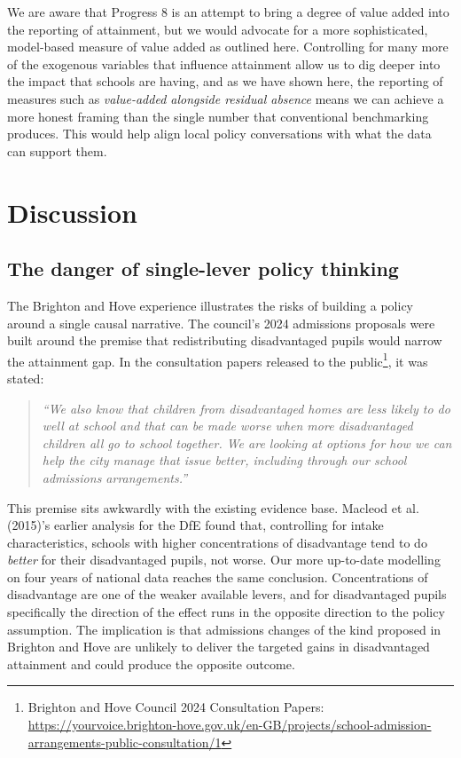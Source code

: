 \documentclass[
  12pt,
  titlepage]{article}
\begin{document}
We are aware that Progress 8 is an attempt to bring a degree of value
added into the reporting of attainment, but we would advocate for a more
sophisticated, model-based measure of value added as outlined here.
Controlling for many more of the exogenous variables that influence
attainment allow us to dig deeper into the impact that schools are
having, and as we have shown here, the reporting of measures such as
\emph{value-added alongside residual absence} means we can achieve a
more honest framing than the single number that conventional
benchmarking produces. This would help align local policy conversations
with what the data can support them.

\section{Discussion}\label{discussion}

\subsection{The danger of single-lever policy
thinking}\label{the-danger-of-single-lever-policy-thinking}

The Brighton and Hove experience illustrates the risks of building a
policy around a single causal narrative. The council's 2024 admissions
proposals were built around the premise that redistributing
disadvantaged pupils would narrow the attainment gap. In the
consultation papers released to the public\footnote{Brighton and Hove
  Council 2024 Consultation Papers:
  \url{https://yourvoice.brighton-hove.gov.uk/en-GB/projects/school-admission-arrangements-public-consultation/1}},
it was stated:

\begin{quote}
\emph{``We also know that children from disadvantaged homes are less
likely to do well at school and that can be made worse when more
disadvantaged children all go to school together. We are looking at
options for how we can help the city manage that issue better, including
through our school admissions arrangements.''}
\end{quote}

This premise sits awkwardly with the existing evidence base. Macleod et
al. (2015)'s earlier analysis for the DfE found that, controlling for
intake characteristics, schools with higher concentrations of
disadvantage tend to do \emph{better} for their disadvantaged pupils,
not worse. Our more up-to-date modelling on four years of national data
reaches the same conclusion. Concentrations of disadvantage are one of
the weaker available levers, and for disadvantaged pupils specifically
the direction of the effect runs in the opposite direction to the policy
assumption. The implication is that admissions changes of the kind
proposed in Brighton and Hove are unlikely to deliver the targeted gains
in disadvantaged attainment and could produce the opposite outcome.
\end{document}
